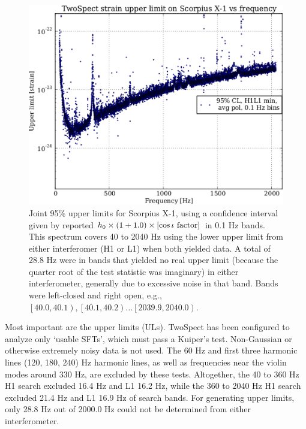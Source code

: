\begin{figure}
\begin{center}
\includegraphics[width=0.68\paperwidth,height=0.48\paperheight]{plots/ScoX1ULs.eps}
\caption{
Joint 95\% upper limits for Scorpius X-1, using a confidence interval given by reported $h_0 \times \left( 1 + 1.0 \right) \times \left[\cos\iota \textup{ factor}\right]$ in 0.1 Hz bands. 
This spectrum covers 40 to 2040 Hz using the lower upper limit from either interferomer (H1 or L1) when both yielded data. 
A total of 28.8 Hz were in bands that yielded no real upper limit (because the quarter root of the test statistic was imaginary) in either interferometer, generally due to excessive noise in that band.
Bands were left-closed and right open, e.g., $\left[ 40.0,40.1\right), \left[ 40.1,40.2\right)\ldots \left[2039.9,2040.0\right)$.
}
\label{S6_H1L1_UL}
\end{center}
\end{figure}

Most important are the upper limits (ULs).
TwoSpect has been configured to analyze only `usable SFTs', which must pass a Kuiper's test.
Non-Gaussian or otherwise extremely noisy data is not used.
The 60 Hz and first three harmonic lines (120, 180, 240) Hz harmonic lines, as well as frequencies near the violin modes around 330 Hz, are excluded by these tests.
Altogether, the 40 to 360 Hz H1 search excluded 16.4 Hz and L1 16.2 Hz, while the 360 to 2040 Hz H1 search excluded 21.4 Hz and L1 16.9 Hz of search bands.
For generating upper limits, only 28.8 Hz out of 2000.0 Hz could not be determined from either interferometer.

